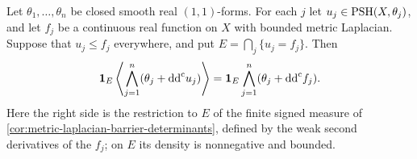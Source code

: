 \begin{theorem}\label{thm:irregular-mixed-contact-density}
Let $\theta_1,\ldots,\theta_n$ be closed smooth real $(1,1)$-forms. For each $j$ let $u_j\in\mathrm{PSH}(X,\theta_j)$, and let $f_j$ be a continuous real function on $X$ with bounded metric Laplacian. Suppose that $u_j\leq f_j$ everywhere, and put $E=\bigcap_j\{u_j=f_j\}$. Then
\begin{equation}\label{eq:irregular-mixed-contact-density}
 \mathbf1_E\left\langle\bigwedge_{j=1}^n
                    (\theta_j+\mathrm{dd}^{\mathrm{c}} u_j)\right\rangle
   =\mathbf1_E\bigwedge_{j=1}^n(\theta_j+\mathrm{dd}^{\mathrm{c}} f_j).
\end{equation}
Here the right side is the restriction to $E$ of the finite signed measure of \cref{cor:metric-laplacian-barrier-determinants}, defined by the weak second derivatives of the $f_j$; on $E$ its density is nonnegative and bounded.
\end{theorem}
